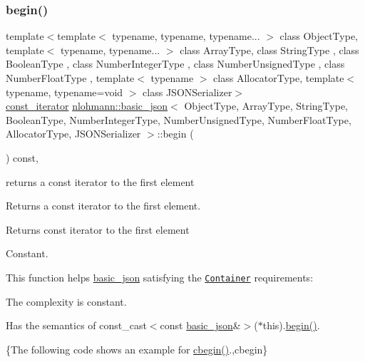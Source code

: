 \subsubsection{\texorpdfstring{begin()}{begin()}\hspace{0.1cm}{\footnotesize\ttfamily [2/2]}}
{\footnotesize\ttfamily template$<$template$<$ typename, typename, typename... $>$ class Object\+Type, template$<$ typename, typename... $>$ class Array\+Type, class String\+Type , class Boolean\+Type , class Number\+Integer\+Type , class Number\+Unsigned\+Type , class Number\+Float\+Type , template$<$ typename $>$ class Allocator\+Type, template$<$ typename, typename=void $>$ class J\+S\+O\+N\+Serializer$>$ \\
\hyperlink{classnlohmann_1_1basic__json_a41a70cf9993951836d129bb1c2b3126a}{const\+\_\+iterator} \hyperlink{classnlohmann_1_1basic__json}{nlohmann\+::basic\+\_\+json}$<$ Object\+Type, Array\+Type, String\+Type, Boolean\+Type, Number\+Integer\+Type, Number\+Unsigned\+Type, Number\+Float\+Type, Allocator\+Type, J\+S\+O\+N\+Serializer $>$\+::begin (\begin{DoxyParamCaption}{ }\end{DoxyParamCaption}) const\hspace{0.3cm}{\ttfamily [inline]}, {\ttfamily [noexcept]}}



returns a const iterator to the first element 

Returns a const iterator to the first element.

 \begin{DoxyReturn}{Returns}
const iterator to the first element
\end{DoxyReturn}
Constant.

This function helps {\ttfamily \hyperlink{classnlohmann_1_1basic__json}{basic\+\_\+json}} satisfying the \href{http://en.cppreference.com/w/cpp/concept/Container}{\tt Container} requirements\+:
\begin{DoxyItemize}
\item The complexity is constant.
\item Has the semantics of {\ttfamily const\+\_\+cast$<$const \hyperlink{classnlohmann_1_1basic__json}{basic\+\_\+json}\&$>$($\ast$this).\hyperlink{classnlohmann_1_1basic__json_a0ff28dac23f2bdecee9564d07f51dcdc}{begin()}}.
\end{DoxyItemize}

\{The following code shows an example for {\ttfamily \hyperlink{classnlohmann_1_1basic__json_ad865d6c291b237ae508d5cb2146b5877}{cbegin()}}.,cbegin\}

